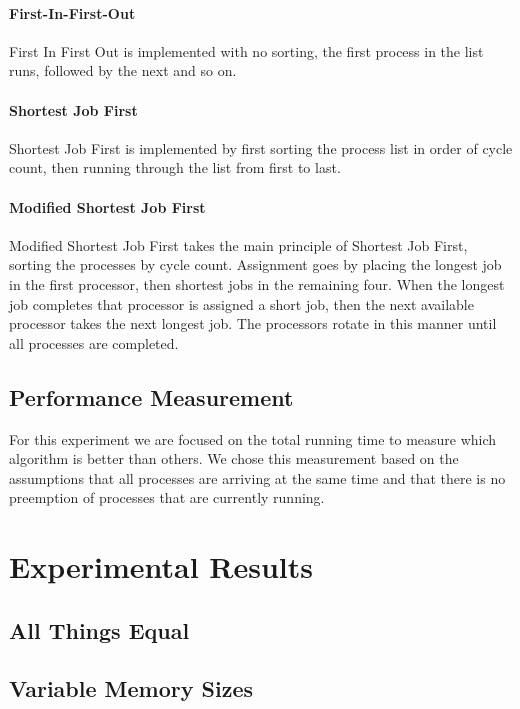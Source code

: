 \documentclass[12pt]{article}
\begin{document}
    \paragraph{First-In-First-Out}

    First In First Out is implemented with no sorting, the first process in the list runs, followed by the next and so on.

    \paragraph{Shortest Job First}

    Shortest Job First is implemented by first sorting the process list in order of cycle count, then running through the list from first to last.

    \paragraph{Modified Shortest Job First}

    Modified Shortest Job First takes the main principle of Shortest Job First, sorting the processes by cycle count. Assignment goes by placing the longest job in the first processor, then shortest jobs in the remaining four. When the longest job completes that processor is assigned a short job, then the next available processor takes the next longest job. The processors rotate in this manner until all processes are completed.

  \subsection{Performance Measurement}

  For this experiment we are focused on the total running time to measure which algorithm is better than others. We chose this measurement based on the assumptions that all processes are arriving at the same time and that there is no preemption of processes that are currently running.

\newpage
\section{Experimental Results}

  \subsection{All Things Equal}


  \subsection{Variable Memory Sizes}
\end{document}
